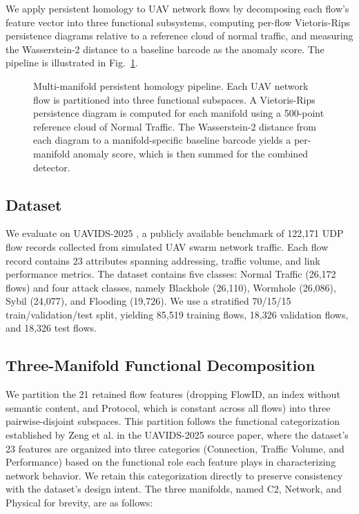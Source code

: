 \documentclass[conf]{new-aiaa}
\begin{document}
We apply persistent homology to UAV network flows by decomposing each flow's feature vector into three functional subsystems, computing per-flow Vietoris-Rips persistence diagrams relative to a reference cloud of normal traffic, and measuring the Wasserstein-2 distance to a baseline barcode as the anomaly score. The pipeline is illustrated in Fig.~\ref{fig:pipeline}.

\begin{figure}[h]
\centering
\resizebox{\columnwidth}{!}{}
\caption{Multi-manifold persistent homology pipeline. Each UAV network flow is partitioned into three functional subspaces. A Vietoris-Rips persistence diagram is computed for each manifold using a 500-point reference cloud of Normal Traffic. The Wasserstein-2 distance from each diagram to a manifold-specific baseline barcode yields a per-manifold anomaly score, which is then summed for the combined detector.}
\label{fig:pipeline}
\end{figure}

\subsection{Dataset}

We evaluate on UAVIDS-2025 \cite{Zeng}, a publicly available benchmark of 122,171 UDP flow records collected from simulated UAV swarm network traffic. Each flow record contains 23 attributes spanning addressing, traffic volume, and link performance metrics. The dataset contains five classes: Normal Traffic (26,172 flows) and four attack classes, namely Blackhole (26,110), Wormhole (26,086), Sybil (24,077), and Flooding (19,726). We use a stratified 70/15/15 train/validation/test split, yielding 85,519 training flows, 18,326 validation flows, and 18,326 test flows.

\subsection{Three-Manifold Functional Decomposition}

We partition the 21 retained flow features (dropping FlowID, an index without semantic content, and Protocol, which is constant across all flows) into three pairwise-disjoint subspaces. This partition follows the functional categorization established by Zeng et al. \cite{Zeng} in the UAVIDS-2025 source paper, where the dataset's 23 features are organized into three categories (Connection, Traffic Volume, and Performance) based on the functional role each feature plays in characterizing network behavior. We retain this categorization directly to preserve consistency with the dataset's design intent. The three manifolds, named C2, Network, and Physical for brevity, are as follows:
\end{document}
